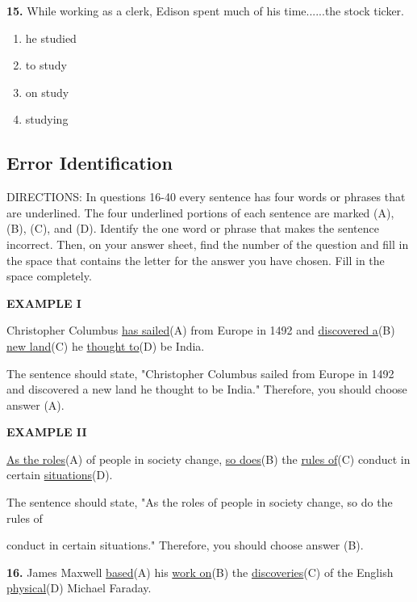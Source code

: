 \documentclass[12pt]{article}
\begin{document}
\par
\vspace{0.25\baselineskip}
\noindent\textbf{15.} While working as a clerk, Edison spent much of his time......the stock ticker.
\begin{enumerate}[label=(\Alph*),leftmargin=*,itemsep=0.2em]
\item he studied
\item to study
\item on study
\item studying
\end{enumerate}
\par
\vspace{0.25\baselineskip}
\subsection*{Error Identification}
DIRECTIONS: In questions 16-40 every sentence has four words or phrases that are underlined. The four underlined portions of each sentence are marked (A), (B), (C), and (D). Identify the one word or phrase that makes the sentence incorrect. Then, on your answer sheet, find the number of the question and fill in the space that contains the letter for the answer you have chosen. Fill in the space completely.\par
\begin{exampleblock}
\textbf{EXAMPLE I}\par
Christopher Columbus \uline{has sailed}(A) from Europe in 1492 and \uline{discovered a}(B) \uline{new land}(C) he \uline{thought to}(D) be India.\par
The sentence should state, "Christopher Columbus sailed from Europe in 1492 and discovered a new land he thought to be India." Therefore, you should choose answer (A).\par
\end{exampleblock}
\begin{exampleblock}
\textbf{EXAMPLE II}\par
\uline{As the roles}(A) of people in society change, \uline{so does}(B) the \uline{rules of}(C) conduct in certain \uline{situations}(D).\par
The sentence should state, "As the roles of people in society change, so do the rules of\par
conduct in certain situations." Therefore, you should choose answer (B).\par
\end{exampleblock}
\noindent\textbf{16.} James Maxwell \uline{based}(A) his \uline{work on}(B) the \uline{discoveries}(C) of the English \uline{physical}(D) Michael Faraday.
\end{document}
